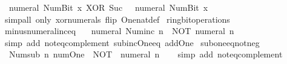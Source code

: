 \begin{isabellebody}
\ \ {\isacartoucheopen}numeral\ {\isacharparenleft}{\kern0pt}Num{\isachardot}{\kern0pt}Bit{}\ x{\isacharparenright}{\kern0pt}\ XOR\ Suc\ {}\ {\isacharequal}{\kern0pt}\ numeral\ {\isacharparenleft}{\kern0pt}Num{\isachardot}{\kern0pt}Bit{}\ x{\isacharparenright}{\kern0pt}{\isacartoucheclose}\isanewline
%
\isadelimproof
\ \ %
\endisadelimproof
%
\isatagproof
{}\isamarkupfalse%
\ {\isacharparenleft}{\kern0pt}simp{\isacharunderscore}{\kern0pt}all\ only{\isacharcolon}{\kern0pt}\ xor{\isacharunderscore}{\kern0pt}numerals\ flip{\isacharcolon}{\kern0pt}\ One{\isacharunderscore}{\kern0pt}nat{\isacharunderscore}{\kern0pt}def{\isacharparenright}{\kern0pt}%
\endisatagproof
{\isafoldproof}%
%
\isadelimproof
\isanewline
%
\endisadelimproof
\isanewline
{}\isamarkupfalse%
\ ring{\isacharunderscore}{\kern0pt}bit{\isacharunderscore}{\kern0pt}operations\isanewline
{}\isanewline
\isanewline
{}\isamarkupfalse%
\ minus{\isacharunderscore}{\kern0pt}numeral{\isacharunderscore}{\kern0pt}inc{\isacharunderscore}{\kern0pt}eq{\isacharcolon}{\kern0pt}\isanewline
\ \ {\isacartoucheopen}{\isacharminus}{\kern0pt}\ numeral\ {\isacharparenleft}{\kern0pt}Num{\isachardot}{\kern0pt}inc\ n{\isacharparenright}{\kern0pt}\ {\isacharequal}{\kern0pt}\ NOT\ {\isacharparenleft}{\kern0pt}numeral\ n{\isacharparenright}{\kern0pt}{\isacartoucheclose}\isanewline
%
\isadelimproof
\ \ %
\endisadelimproof
%
\isatagproof
{}\isamarkupfalse%
\ {\isacharparenleft}{\kern0pt}simp\ add{\isacharcolon}{\kern0pt}\ not{\isacharunderscore}{\kern0pt}eq{\isacharunderscore}{\kern0pt}complement\ sub{\isacharunderscore}{\kern0pt}inc{\isacharunderscore}{\kern0pt}One{\isacharunderscore}{\kern0pt}eq\ add{\isacharunderscore}{\kern0pt}One{\isacharparenright}{\kern0pt}%
\endisatagproof
{\isafoldproof}%
%
\isadelimproof
\isanewline
%
\endisadelimproof
\isanewline
{}\isamarkupfalse%
\ sub{\isacharunderscore}{\kern0pt}one{\isacharunderscore}{\kern0pt}eq{\isacharunderscore}{\kern0pt}not{\isacharunderscore}{\kern0pt}neg{\isacharcolon}{\kern0pt}\isanewline
\ \ {\isacartoucheopen}Num{\isachardot}{\kern0pt}sub\ n\ num{\isachardot}{\kern0pt}One\ {\isacharequal}{\kern0pt}\ NOT\ {\isacharparenleft}{\kern0pt}{\isacharminus}{\kern0pt}\ numeral\ n{\isacharparenright}{\kern0pt}{\isacartoucheclose}\isanewline
%
\isadelimproof
\ \ %
\endisadelimproof
%
\isatagproof
{}\isamarkupfalse%
\ {\isacharparenleft}{\kern0pt}simp\ add{\isacharcolon}{\kern0pt}\ not{\isacharunderscore}{\kern0pt}eq{\isacharunderscore}{\kern0pt}complement{\isacharparenright}{\kern0pt}%

\end{isabellebody}
